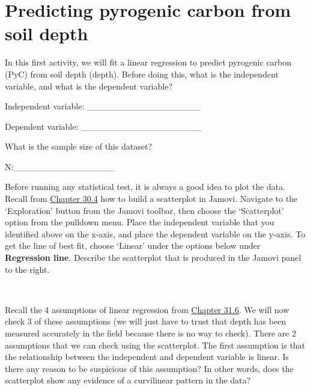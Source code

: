 \documentclass[
]{scrbook}
\begin{document}
\hypertarget{predicting-pyrogenic-carbon-from-soil-depth}{%
\section{Predicting pyrogenic carbon from soil depth}\label{predicting-pyrogenic-carbon-from-soil-depth}}

In this first activity, we will fit a linear regression to predict pyrogenic carbon (PyC) from soil depth (depth).
Before doing this, what is the independent variable, and what is the dependent variable?

Independent variable: \_\_\_\_\_\_\_\_\_\_\_\_\_\_\_\_\_\_

Dependent variable: \_\_\_\_\_\_\_\_\_\_\_\_\_\_\_\_\_\_\_

What is the sample size of this dataset?

N:\_\_\_\_\_\_\_\_\_\_\_\_\_\_\_\_

Before running any statistical test, it is always a good idea to plot the data.
Recall from \protect\hyperlink{pearson-product-moment-correlation-test}{Chapter 30.4} how to build a scatterplot in Jamovi.
Navigate to the `Exploration' button from the Jamovi toolbar, then choose the `Scatterplot' option from the pulldown menu.
Place the independent variable that you identified above on the x-axis, and place the dependent variable on the y-axis.
To get the line of best fit, choose `Linear' under the options below under \textbf{Regression line}.
Describe the scatterplot that is produced in the Jamovi panel to the right.

\begin{verbatim}


\end{verbatim}

Recall the 4 assumptions of linear regression from \protect\hyperlink{regression-assumptions}{Chapter 31.6}.
We will now check 3 of these assumptions (we will just have to trust that depth has been measured accurately in the field because there is no way to check).
There are 2 assumptions that we can check using the scatterplot.
The first assumption is that the relationship between the independent and dependent variable is linear.
Is there any reason to be suspicious of this assumption?
In other words, does the scatterplot show any evidence of a curvilinear pattern in the data?

\begin{verbatim}

\end{verbatim}
\end{document}
